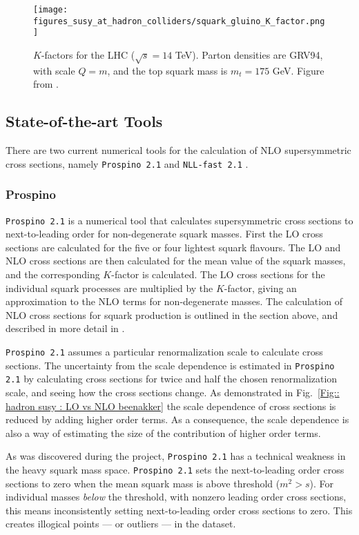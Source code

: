 \documentclass[twoside,english]{uiofysmaster}
\begin{document}
{{\begin{figure}
\centering
\texttt{[image: figures\_susy\_at\_hadron\_colliders/squark\_gluino\_K\_factor.png]}
\caption[$K$-factors for the LHC]{$K$-factors for the LHC ($\sqrt{s}=14$ TeV). Parton densities are GRV94, with scale $Q=m$, and the top squark mass is $m_t=175$ GeV. Figure from \cite{Beenakker:1996ch}.}
\label{Fig:: susy hadron : K-factor LHC}
\end{figure}


\subsection{State-of-the-art Tools}

There are two current numerical tools for the calculation of NLO supersymmetric cross sections, namely \verb|Prospino 2.1| \cite{Beenakker:1996ed} and \verb|NLL-fast 2.1| \cite{Beenakker:2015rna}.

\subsubsection{Prospino}\label{Sec:: susy hadron : Prospino}
\verb|Prospino 2.1| \cite{Beenakker:1996ed} is a numerical tool that calculates supersymmetric cross sections to next-to-leading order for non-degenerate squark masses. First the LO cross sections are calculated for the five or four lightest squark flavours. The LO and NLO cross sections are then calculated for the mean value of the squark masses, and the corresponding $K$-factor is calculated. The LO cross sections for the individual squark processes are multiplied by the $K$-factor, giving an approximation to the NLO terms for non-degenerate masses. The calculation of NLO cross sections for squark production is outlined in the section above, and described in more detail in \cite{Beenakker:1996ed}. 

\verb|Prospino 2.1| assumes a particular renormalization scale to calculate cross sections. The uncertainty from the scale dependence is estimated in \verb|Prospino 2.1| by calculating cross sections for twice and half the chosen renormalization scale, and seeing how the cross sections change. As demonstrated in Fig.~\ref{Fig:: hadron susy : LO vs NLO beenakker} the scale dependence of cross sections is reduced by adding higher order terms. As a consequence, the scale dependence is also a way of estimating the size of the contribution of higher order terms. 


As was discovered during the project, \verb|Prospino 2.1| has a technical weakness in the heavy squark mass space. \verb|Prospino 2.1| sets the next-to-leading order cross sections to zero when the mean squark mass is above threshold ($m^2 > s$). For individual masses \textit{below} the threshold, with nonzero leading order cross sections, this means inconsistently setting next-to-leading order cross sections to zero. This creates illogical points --- or outliers --- in the dataset.

}}
\end{document}
